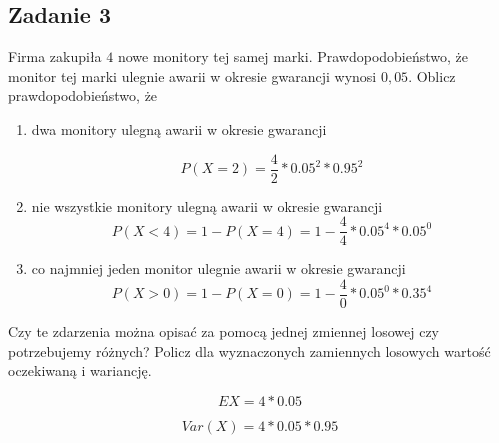 \subsection{Zadanie 3}

Firma zakupiła $4$ nowe monitory tej samej marki. Prawdopodobieństwo, że monitor tej
marki ulegnie awarii w okresie gwarancji wynosi $0,05$. Oblicz prawdopodobieństwo, że

\begin{enumerate}[label=(\alph*)]
\item dwa monitory ulegną awarii w okresie gwarancji

$$
P(X=2) = \frac{4}{2} * 0.05^{2}* 0.95^{2}
$$

\item nie wszystkie monitory ulegną awarii w okresie gwarancji
$$
P(X<4)=1-P(X=4)=1- \frac{4}{4} * 0.05^{4} * 0.05^{0}
$$


\item co najmniej jeden monitor ulegnie awarii w okresie gwarancji
$$
P(X>0)=1- P(X=0)=1- \frac{4}{0} * {0.05}^0 * {0.35}^4
$$
\end{enumerate}

Czy te zdarzenia można opisać za pomocą jednej zmiennej losowej czy potrzebujemy różnych? 
Policz dla wyznaczonych zamiennych losowych wartość oczekiwaną i wariancję.

$$ 
EX=4*{0.05}
$$

$$
Var(X)=4*{0.05}*{0.95}
$$
